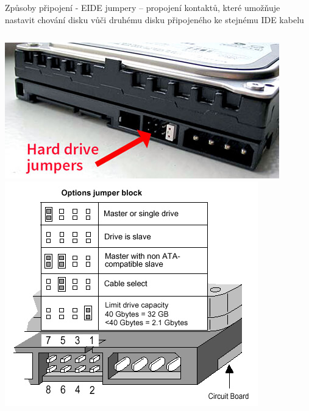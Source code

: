 \documentclass[aspectratio=43]{beamer}
\begin{document}
\begin{frame}{Způsoby připojení - EIDE}
	jumpery – propojení kontaktů, které umožňuje nastavit chování disku vůči druhému disku připojeného ke stejnému IDE kabelu
	\vfill
	\begin{columns}
		\includegraphics[width=1\linewidth]{extrahovane_obrazky/hdd_j.jpeg}
		\includegraphics[width=1\linewidth]{extrahovane_obrazky/ide_j.jpg}
	\end{columns}
	
\end{frame}
\end{document}
